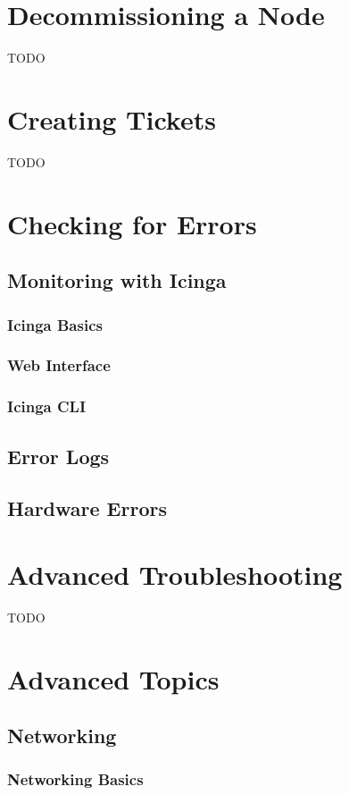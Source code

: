 \documentclass[10pt,letterpaper]{article}
\begin{document}
\section{Decommissioning a Node}
    TODO
\clearpage

\section{Creating Tickets}
    TODO
\clearpage

\section{Checking for Errors}
    \subsection{Monitoring with Icinga}
        \subsubsection{Icinga Basics}
        \subsubsection{Web Interface}
        \subsubsection{Icinga CLI}
    \subsection{Error Logs}
    \subsection{Hardware Errors}
\clearpage

\section{Advanced Troubleshooting}
    TODO
\clearpage

\section{Advanced Topics}
    \subsection{Networking}
        \subsubsection{Networking Basics}
\end{document}
